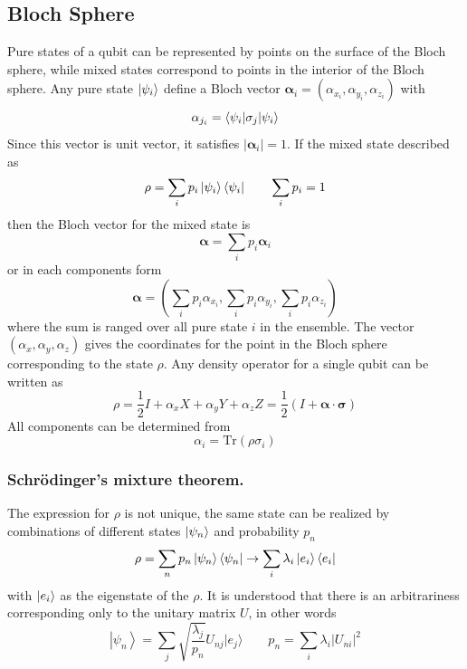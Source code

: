 \documentclass[../../../main.tex]{subfiles}
\begin{document}
\subsection{Bloch Sphere}
Pure states of a qubit can be represented by points on the surface of the Bloch sphere, while mixed states correspond to points in the interior of the Bloch sphere.
Any pure state $\ket{\psi_i}$ define a Bloch vector $\boldsymbol{\alpha}_i=(\alpha_{x_i},\alpha_{y_i},\alpha_{z_i})$ with
\begin{equation*}
  \alpha_{j_i}  = \braket{\psi_i | \sigma_j|\psi_i}
\end{equation*}
Since this vector is unit vector, it satisfies $|\boldsymbol{\alpha}_i|=1$.
If the mixed state described as
\begin{equation*}
  \rho= \sum_i p_i \ket{\psi_i} \bra{\psi_i}\qquad
  \sum_{i } p_i=1
\end{equation*}
then the Bloch vector for the mixed state is
\begin{equation*}
  \boldsymbol{\alpha}= \sum_{i } p_i  \boldsymbol{\alpha}_{i}
\end{equation*}
or in each components form
\begin{equation*}
  \boldsymbol{\alpha}=  \left( \sum_{i} p_i \alpha_{x_i}, \sum_{i} p_i \alpha_{y_i}, \sum_{i} p_i \alpha_{z_i} \right)
\end{equation*}
where the sum is ranged over all pure state $i$ in the ensemble.
The vector $\left( \alpha_{x} , \alpha_{y}, \alpha_{z}\right)$ gives the coordinates for the point in the Bloch sphere corresponding to the state $\rho$.
Any density operator for a single qubit can be written as
\begin{equation*}
  \rho = \frac{1}{2} I + \alpha_x X + \alpha_y Y + \alpha_z Z=\frac{1 }{2 } \left( I +\boldsymbol{\alpha} \cdot \boldsymbol{\sigma} \right)
\end{equation*}
All components can be determined from
\begin{equation*}
  \alpha_i = \mathrm{Tr} (\rho\sigma_i)
\end{equation*}

\subsubsection{Schrödinger's mixture theorem.}
The expression for $\rho$ is not unique, the same state can be realized by combinations of different states $\ket{\psi_n}$ and probability $p_n$
\begin{equation*}
  \rho = \sum_{n} p_n \ket{\psi_n }\bra{\psi_n} \to \sum_{i } \lambda_i   \ket{e_i }\bra{e_i}
\end{equation*}
with $\ket{e_i}$ as the eigenstate of the $\rho$.
It is understood that there is an arbitrariness corresponding only to the unitary matrix $U$, in other words
\begin{equation*}
  \left|\psi_n\right\rangle = \sum_j \sqrt{\frac{\lambda_j}{p_n}}U_{nj}|e_j\rangle\qquad
  p_n = \sum_i \lambda_i\big|U_{ni}\big|^2
\end{equation*}
\end{document}
